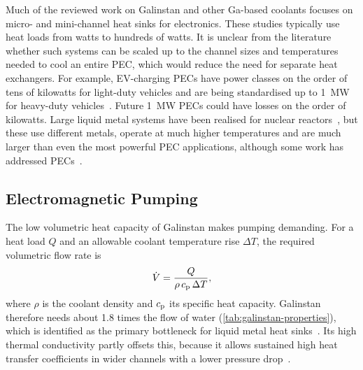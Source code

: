 Much of the reviewed work on Galinstan and other Ga-based coolants focuses on
micro- and mini-channel heat sinks for electronics. These studies typically use heat loads
from watts to hundreds of watts. It is unclear from the literature whether such
systems can be scaled up to the channel sizes and temperatures needed to cool an
entire PEC, which would reduce the need for separate heat exchangers. For example, EV-charging PECs have power classes on the order of tens of
kilowatts for light-duty vehicles and are being standardised up to
\SI{1}{\mega\watt} for heavy-duty vehicles~\cite{lawton_power_2024,liu_thermal_2025,abb_e-mobility_mcs1200_nodate}. Future \SI{1}{\mega\watt} PECs could have losses on the order of kilowatts.
Large liquid metal systems have been realised for nuclear reactors~\cite{rowinski_small_2015},
but these use different metals, operate at much higher temperatures and are much
larger than even the most powerful PEC applications, although some work has
addressed PECs~\cite{fan_ultra-efficient_2026,fan_liquid_2021}.

\subsection{Electromagnetic Pumping}
\label{sec:em-pumping}

The low volumetric heat capacity of Galinstan makes pumping demanding. For a
heat load $Q$ and an allowable coolant temperature rise $\Delta T$, the required volumetric
flow rate is
\begin{equation}
  \dot{V} = \frac{Q}{\rho \, c_{\mathrm{p}} \, \Delta T},
  \label{eq:flow-requirement}
\end{equation}
where $\rho$ is the coolant density and $c_{\mathrm{p}}$ its specific heat capacity.
Galinstan therefore needs about 1.8 times the flow of water
(\cref{tab:galinstan-properties}), which is identified as the primary
bottleneck for liquid metal heat sinks~\cite{hodes_potential_2014,an_liquid_2024}.
Its high thermal conductivity partly offsets this, because it allows sustained high heat
transfer coefficients in wider channels with a lower pressure
drop~\cite{zhang_water-based_2015,an_liquid_2024}.

